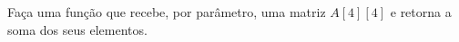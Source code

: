 
\question[10]

Faça uma função que recebe, por parâmetro, uma matriz $A[4][4]$ e retorna a soma dos seus elementos.